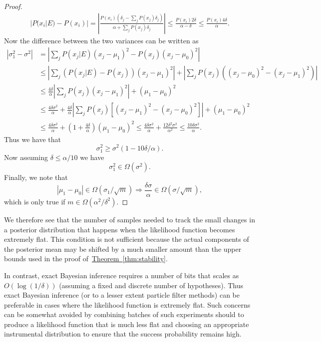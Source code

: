 \documentclass[aps,pra,amsmath,twocolumn,amssymb,superscriptaddress]{revtex4-1}
\newcommand{\thm}[1]{\hyperref[thm:#1]{Theorem~\ref*{thm:#1}}}
\begin{document}
\begin{proof}
\begin{align}
|P(x_i|E)-P(x_i)| = \left|\frac{P(x_i)(\delta_j-\sum_j P(x_j)\delta_j)}{\alpha+\sum_j P(x_j)\delta_j}\right|\le \frac{P(x_i) 2\delta}{\alpha-\delta}\le \frac{P(x_i) 4\delta}{\alpha}.
\end{align}
Now the difference between the two variances can be written as
\begin{align}
|\sigma_1^2-\sigma^2| &= \left|\sum_j  P(x_j|E)(x_j-\mu_1)^2-P(x_j)(x_j-\mu_0)^2\right|\nonumber\\
 &\le \left|\sum_j  (P(x_j|E)-P(x_j))(x_j-\mu_1)^2\right|+\left|\sum_j P(x_j)\left((x_j-\mu_0)^2-(x_j-\mu_1)^2\right)\right|\nonumber\\
 &\le  \frac{4\delta}{\alpha}\left|\sum_j  P(x_j)(x_j-\mu_1)^2\right|+(\mu_1-\mu_0)^2\nonumber\\
&\le \frac{4\delta\sigma^2}{\alpha}+\frac{4\delta}{\alpha}\left|\sum_j P(x_j)[(x_j-\mu_1)^2-(x_j-\mu_0)^2]  \right|+(\mu_1-\mu_0)^2\nonumber\\
&\le \frac{4\delta\sigma^2}{\alpha}+(1+\frac{4\delta}{\alpha})(\mu_1-\mu_0)^2\le \frac{4\delta\sigma^2}{\alpha}+ \frac{12\delta^2\sigma^2}{\alpha^2}\le \frac{10\delta\sigma^2}{\alpha}.
\end{align}
Thus we have that
\begin{equation}
\sigma_1^2 \ge \sigma^2(1-10\delta/\alpha).
\end{equation}
Now assuming $\delta\le \alpha/10$ we have 
\begin{equation}
\sigma_1^2\in \Omega(\sigma^2).
\end{equation}
Finally, we note that
\begin{equation}
|\mu_1-\mu_0| \in \Omega(\sigma_1/\sqrt{m}) \Rightarrow \frac{\delta \sigma}{\alpha} \in \Omega(\sigma/\sqrt{m}),
\end{equation}
which is only true if $m\in \Omega(\alpha^2/\delta^2)$.
\end{proof}
We therefore see that the number of samples needed to track the small changes in a posterior distribution that happens when the likelihood function becomes extremely flat.  This condition is not sufficient because the actual components of the posterior mean may be shifted by a much smaller amount than the upper bounds used in the proof of~\thm{stability}.

In contrast, exact Bayesian inference requires a number of bits that scales as $O(\log(1/\delta))$ (assuming a fixed and discrete number of hypotheses).  Thus exact Bayesian inference (or to a lesser extent particle filter methods) can be preferable in cases where the likelihood function is extremely flat.  Such concerns can be somewhat  avoided  by combining batches of such experiments should to produce a likelihood function that is much less flat and choosing an appropriate instrumental distribution to ensure that the success probability remains high.
\end{document}
